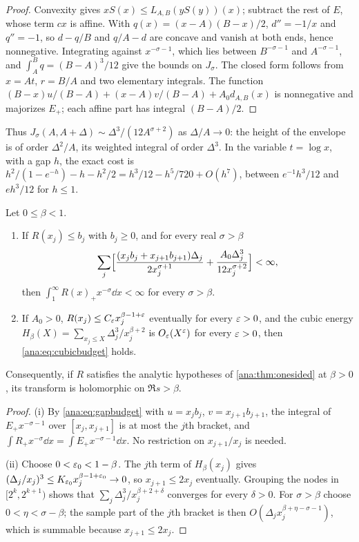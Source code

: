 \begin{proof}
Convexity gives $xS(x)\le L_{A,B}(yS(y))(x)$; subtract the rest of $E$, whose term $cx$ is
affine. With $q(x)=(x-A)(B-x)/2$, $d''=-1/x$ and $q''=-1$, so $d-q/B$ and $q/A-d$ are concave
and vanish at both ends, hence nonnegative. Integrating against $x^{-\sigma-1}$, which lies
between $B^{-\sigma-1}$ and $A^{-\sigma-1}$, and $\int_A^Bq=(B-A)^3/12$ give the bounds on
$J_\sigma$. The closed form follows from $x=At$, $r=B/A$ and two elementary integrals. The
function $(B-x)u/(B-A)+(x-A)v/(B-A)+A_0d_{A,B}(x)$ is nonnegative and majorizes $E_+$; each
affine part has integral $(B-A)/2$.
\end{proof}

Thus $J_\sigma(A,A+\Delta)\sim\Delta^3/(12A^{\sigma+2})$ as $\Delta/A\to0$: the height of the
envelope is of order $\Delta^2/A$, its weighted integral of order $\Delta^3$. In the variable
$t=\log x$, with a gap $h$, the exact cost is $h^2/(1-e^{-h})-h-h^2/2=h^3/12-h^5/720+O(h^7)$,
between $e^{-1}h^3/12$ and $eh^3/12$ for $h\le1$.

\begin{theorem}\label{ana:thm:cubic}
Let $0\le\beta<1$.
\begin{enumerate}[label=\textup{(\roman*)}]
\item If $R(x_j)\le b_j$ with $b_j\ge0$, and for every real $\sigma>\beta$
 \begin{equation}\label{ana:eq:cubicbudget}
  \sum_j\Bigl[\frac{(x_jb_j+x_{j+1}b_{j+1})\Delta_j}{2x_j^{\sigma+1}}
  +\frac{A_0\Delta_j^3}{12x_j^{\sigma+2}}\Bigr]<\infty,
 \end{equation}
 then $\int_1^\infty R(x)_+x^{-\sigma}\dd x<\infty$ for every $\sigma>\beta$.
\item If $A_0>0$, $R(x_j)\le C_\varepsilon x_j^{\beta-1+\varepsilon}$ eventually for every $\varepsilon>0$, and the
 cubic energy $H_\beta(X)=\sum_{x_j\le X}\Delta_j^3/x_j^{\beta+2}$ is $O_\varepsilon(X^\varepsilon)$ for
 every $\varepsilon>0$, then \eqref{ana:eq:cubicbudget} holds.
\end{enumerate}
Consequently, if $R$ satisfies the analytic hypotheses of \cref{ana:thm:onesided} at $\beta>0$,
its transform is holomorphic on $\Re s>\beta$.
\end{theorem}

\begin{proof}
(i) By \eqref{ana:eq:gapbudget} with $u=x_jb_j$, $v=x_{j+1}b_{j+1}$, the integral of $E_+x^{-\sigma-1}$
over $[x_j,x_{j+1}]$ is at most the $j$th bracket, and $\int R_+x^{-\sigma}\dd x=\int E_+x^{-\sigma-1}\dd x$.
No restriction on $x_{j+1}/x_j$ is needed.

(ii) Choose $0<\varepsilon_0<1-\beta$. The $j$th term of $H_\beta(x_j)$ gives
$(\Delta_j/x_j)^3\le K_{\varepsilon_0}x_j^{\beta-1+\varepsilon_0}\to0$, so $x_{j+1}\le2x_j$ eventually.
Grouping the nodes in $[2^k,2^{k+1})$ shows that $\sum_j\Delta_j^3/x_j^{\beta+2+\delta}$ converges
for every $\delta>0$. For $\sigma>\beta$ choose $0<\eta<\sigma-\beta$; the sample part of the
$j$th bracket is then $O(\Delta_jx_j^{\beta+\eta-\sigma-1})$, which is summable because
$x_{j+1}\le2x_j$.
\end{proof}

